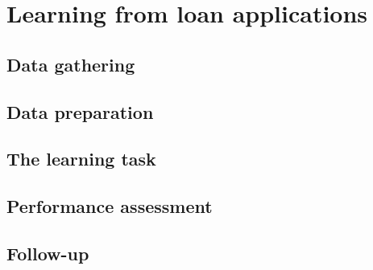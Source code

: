 \chapter{Learning from loan applications}


\section{Data gathering}



\section{Data preparation}



\section{The learning task}



\section{Performance assessment}



\section{Follow-up}